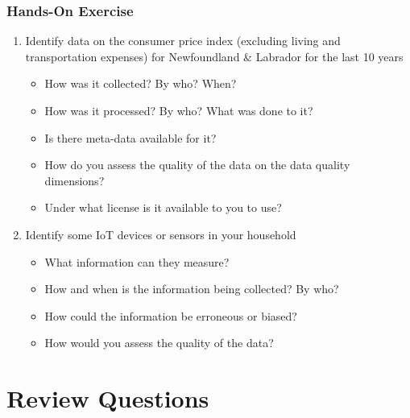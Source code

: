 \begin{tcolorbox}[colback=code]
\subsubsection*{Hands-On Exercise} 
\begin{enumerate}
	\item Identify data on the consumer price index (excluding living and transportation expenses) for Newfoundland \& Labrador for the last 10 years
	\begin{itemize}
		\item How was it collected? By who? When?
		\item How was it processed? By who? What was done to it?
		\item Is there meta-data available for it?
		\item How do you assess the quality of the data on the data quality dimensions?
		\item Under what license is it available to you to use?
	\end{itemize}
	\item Identify some IoT devices or sensors in your household
	\begin{itemize}
		\item What information can they measure?
		\item How and when is the information being collected? By who?
		\item How could the information be erroneous or biased?
		\item How would you assess the quality of the data?
	\end{itemize}
\end{enumerate}
\end{tcolorbox}

\section{Review Questions}

